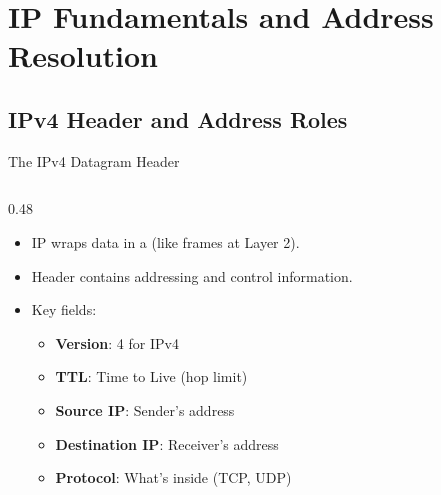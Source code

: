 \documentclass[aspectratio=169]{beamer}  %
\begin{document}
\section{IP Fundamentals and Address Resolution}
\subsection{IPv4 Header and Address Roles}


\begin{frame}{The IPv4 Datagram Header}
    \begin{columns}[T]
        \begin{column}{0.48\textwidth}
            \begin{itemize}
                \item IP wraps data in a  (like frames at Layer 2).
                \item Header contains addressing and control information.
                \item Key fields:
                    \begin{itemize}
                        \scriptsize
                        \item \textbf{Version}: 4 for IPv4
                        \item \textbf{TTL}: Time to Live (hop limit)
                        \item \textbf{Source IP}: Sender's address
                        \item \textbf{Destination IP}: Receiver's address
                        \item \textbf{Protocol}: What's inside (TCP, UDP)
                    \end{itemize}
            \end{itemize}
            

\end{column}
\end{columns}
\end{frame}
\end{document}
